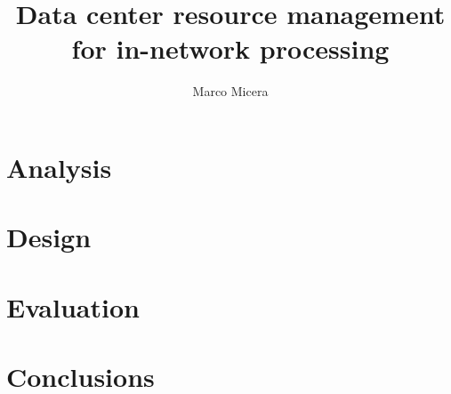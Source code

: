 

\title{Data center resource management for in-network processing}
\date{} %
\author{Marco Micera}



\maketitle




\section{Analysis}



\section{Design}


\section{Evaluation}


\section{Conclusions}





